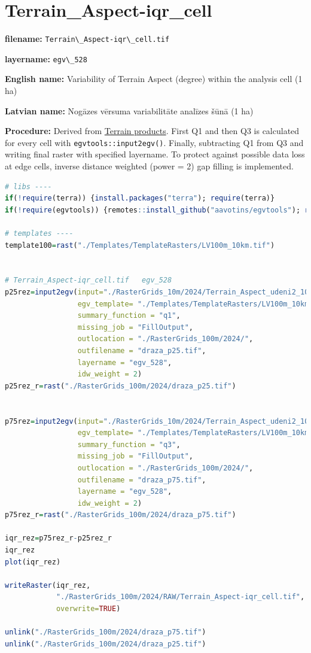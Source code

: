 \documentclass[
]{book}
\newcommand{\passthrough}[1]{#1}
\begin{document}
\section{Terrain\_Aspect-iqr\_cell}\label{ch06.528}

\textbf{filename:} \passthrough{\lstinline!Terrain\_Aspect-iqr\_cell.tif!}

\textbf{layername:} \passthrough{\lstinline!egv\_528!}

\textbf{English name:} Variability of Terrain Aspect (degree) within the analysis cell (1 ha)

\textbf{Latvian name:} Nogāzes vērsuma variabilitāte analīzes šūnā (1 ha)

\textbf{Procedure:} Derived from \hyperref[Ch05.01]{Terrain products}. First Q1 and then Q3
is calculated for every cell with \passthrough{\lstinline!egvtools::input2egv()!}. Finally, subtracting
Q1 from Q3 and writing final raster with specified layername. To protect against
possible data loss at edge cells, inverse distance weighted (power = 2) gap filling
is implemented.

\begin{lstlisting}[language=R]
# libs ----
if(!require(terra)) {install.packages("terra"); require(terra)}
if(!require(egvtools)) {remotes::install_github("aavotins/egvtools"); require(egvtools)}

# templates ----
template100=rast("./Templates/TemplateRasters/LV100m_10km.tif")


# Terrain_Aspect-iqr_cell.tif   egv_528
p25rez=input2egv(input="./RasterGrids_10m/2024/Terrain_Aspect_udeni2_10m.tif",
                 egv_template= "./Templates/TemplateRasters/LV100m_10km.tif",
                 summary_function = "q1",
                 missing_job = "FillOutput",
                 outlocation = "./RasterGrids_100m/2024/",
                 outfilename = "draza_p25.tif",
                 layername = "egv_528",
                 idw_weight = 2)
p25rez_r=rast("./RasterGrids_100m/2024/draza_p25.tif")


p75rez=input2egv(input="./RasterGrids_10m/2024/Terrain_Aspect_udeni2_10m.tif",
                 egv_template= "./Templates/TemplateRasters/LV100m_10km.tif",
                 summary_function = "q3",
                 missing_job = "FillOutput",
                 outlocation = "./RasterGrids_100m/2024/",
                 outfilename = "draza_p75.tif",
                 layername = "egv_528",
                 idw_weight = 2)
p75rez_r=rast("./RasterGrids_100m/2024/draza_p75.tif")

iqr_rez=p75rez_r-p25rez_r
iqr_rez
plot(iqr_rez)

writeRaster(iqr_rez,
            "./RasterGrids_100m/2024/RAW/Terrain_Aspect-iqr_cell.tif",
            overwrite=TRUE)

unlink("./RasterGrids_100m/2024/draza_p75.tif")
unlink("./RasterGrids_100m/2024/draza_p25.tif")
\end{lstlisting}
\end{document}
